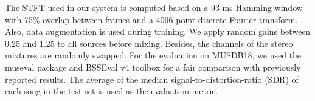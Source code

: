 \documentclass[a4paper]{article}
\begin{document}
The STFT used in our system is computed based on a 93 ms Hamming window with 75\% overlap between frames and a 4096-point discrete Fourier transform. Also, data augmentation \cite{uhlich2017improving} is used during training. We apply random gains between 0.25 and 1.25 to all sources before mixing. Besides, the channels of the stereo mixtures are randomly swapped. For the evaluation on MUSDB18, we used the museval package \cite{stoter20182018} and BSSEval v4 toolbox \cite{vincent2006performance} for a fair comparison with previously reported results. The average of the median signal-to-distortion-ratio (SDR) of each song in the test set is used as the evaluation metric.

\begin{table*}[!ht]
\end{table*}
\end{document}
